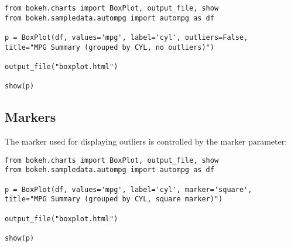 \documentclass[a4paper,12pt]{article}
\begin{document}
{
	\large
\begin{verbatim}
from bokeh.charts import BoxPlot, output_file, show
from bokeh.sampledata.autompg import autompg as df

p = BoxPlot(df, values='mpg', label='cyl', outliers=False,
title="MPG Summary (grouped by CYL, no outliers)")

output_file("boxplot.html")

show(p)
\end{verbatim}
}

\subsection*{Markers}
The marker used for displaying outliers is controlled by the marker parameter:
{
	\large
	\begin{verbatim}
from bokeh.charts import BoxPlot, output_file, show
from bokeh.sampledata.autompg import autompg as df

p = BoxPlot(df, values='mpg', label='cyl', marker='square',
title="MPG Summary (grouped by CYL, square marker)")

output_file("boxplot.html")

show(p)
\end{verbatim}
}
\end{document}
